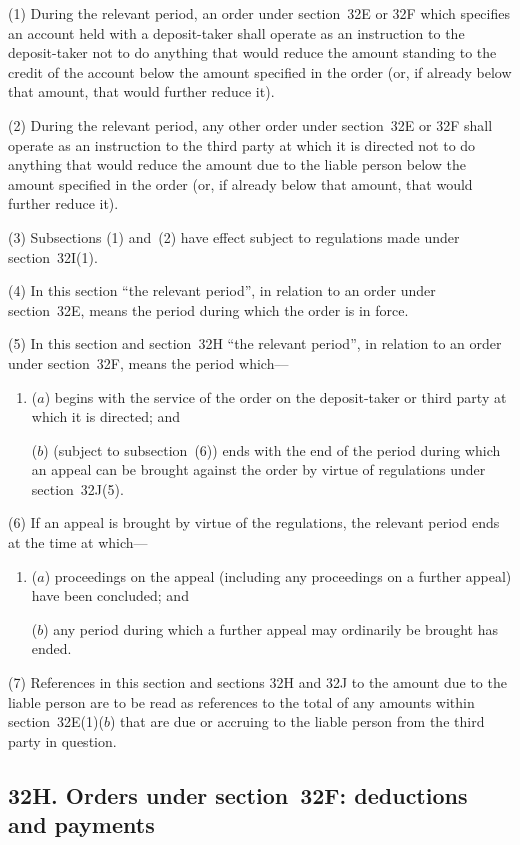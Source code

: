 \documentclass[12pt,a4paper]{article}
\begin{document}
(1) During the relevant period, an order under section~32E or 32F which
specifies an account held with a deposit-taker shall operate as an instruction to the deposit-taker not to do anything that would reduce the amount standing to the credit of the account below the amount specified in the order (or, if already below that amount, that would further reduce it).

(2)
During the relevant period, any other order under section~32E or 32F shall operate as an instruction to the third party at which it is directed not to do anything that would reduce the amount due to the liable person below the amount specified in the order (or, if already below that amount, that would further reduce it).

(3)
Subsections (1) and~(2) have effect subject to regulations made under section~32I(1).

(4)
In this section “the relevant period”, in relation to an order under section~32E, means the period during which the order is in force.

(5)
In this section and section~32H “the relevant period”, in relation to an order under section~32F, means the period which---
\begin{enumerate}\item[]
($a$) begins with the service of the order on the deposit-taker or third party at which it is directed; and

($b$) (subject to subsection~(6)) ends with the end of the period during which an appeal can be brought against the order by virtue of regulations under section~32J(5).
\end{enumerate}

(6) If an appeal is brought by virtue of the regulations, the relevant period ends at the time at which---
\begin{enumerate}\item[]
($a$) proceedings on the appeal (including any proceedings on a further appeal) have been concluded; and

($b$) any period during which a further appeal may ordinarily be brought has ended.
\end{enumerate}

(7) References in this section and sections 32H and 32J to the amount due to the liable person are to be read as references to the total of any amounts within section~32E(1)($b$) that are due or accruing to the liable person from the third party in question.

\subsection{32H. Orders under section~32F: deductions and payments}
\end{document}
